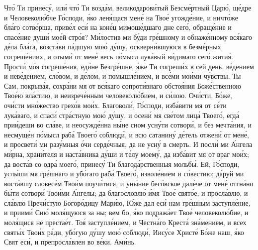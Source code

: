 \begin{mymulticols}
Чт\'{о} Ти принес\'{у}, ил\'{и} чт\'{о} Ти возд\'{а}м, великодаров\'{и}тый Безсм\'{е}ртный Цар\'{ю}, щ\'{е}дре и Человекол\'{ю}бче Г\'{о}споди, \'{я}ко лен\'{я}щася мен\'{е} на Тво\'{е} угожд\'{е}ние, и ничт\'{о}же бл\'{а}го сотв\'{о}рша, прив\'{е}л ес\'{и} на кон\'{е}ц мимош\'{е}дшаго дне сег\'{о}, обращ\'{е}ние и спас\'{е}ние душ\'{и} мо\'{е}й стр\'{о}я? М\'{и}лостив ми б\'{у}ди гр\'{е}шному и обнаж\'{е}нному вс\'{я}каго д\'{е}ла бл\'{а}га, возст\'{а}ви п\'{а}дшую мо\'{ю} д\'{у}шу, оскверн\'{и}вшуюся в безм\'{е}рных согреш\'{е}ниих, и отым\'{и} от мен\'{е} весь п\'{о}мысл лук\'{а}вый в\'{и}димаго сег\'{о} жити\'{я}. Прост\'{и} м\'{о}я согреш\'{е}ния, ед\'{и}не Безгр\'{е}шне, \'{я}же Ти согреш\'{и}х в сей день, в\'{е}дением и нев\'{е}дением, сл\'{о}вом, и д\'{е}лом, и помышл\'{е}нием, и вс\'{е}ми мо\'{и}ми ч\'{у}вствы. Ты Сам, покрыв\'{а}я, сохр\'{а}ни мя от вс\'{я}каго сопрот\'{и}внаго обсто\'{я}ния Бож\'{е}ственною Тво\'{е}ю вл\'{а}стию, и неизреч\'{е}нным человекол\'{ю}бием, и с\'{и}лою. Оч\'{и}сти, Б\'{о}же, оч\'{и}сти мн\'{о}жество грех\'{о}в мо\'{и}х. Благовол\'{и}, Г\'{о}споди, изб\'{а}вити мя от с\'{е}ти лук\'{а}ваго, и спас\'{и} стр\'{а}стную мо\'{ю} д\'{у}шу, и осен\'{и} мя св\'{е}том лиц\'{а} Твоег\'{о}, егд\'{а} при\'{и}деши во сл\'{а}ве, и неосужд\'{е}нна н\'{ы}не сном усн\'{у}ти сотвор\'{и}, и без мечт\'{а}ния, и несмущ\'{е}н п\'{о}мысл раб\'{а} Твоег\'{о} соблюд\'{и}, и всю сатанин\'{у} д\'{е}тель отжен\'{и} от мен\'{е}, и просвет\'{и} ми раз\'{у}мныя \'{о}чи серд\'{е}чныя, да не усн\'{у} в смерть. И посл\'{и} ми \'{А}нгела м\'{и}рна, хран\'{и}теля и наст\'{а}вника д\'{у}ши и т\'{е}лу моем\'{у}, да изб\'{а}вит мя от враг мо\'{и}х; да вост\'{а}в со одр\'{а} моег\'{о}, принес\'{у} Ти благод\'{а}рственныя мольб\'{ы}. Ей, Г\'{о}споди, усл\'{ы}ши мя гр\'{е}шнаго и уб\'{о}гаго раб\'{а} Твоег\'{о}, извол\'{е}нием и с\'{о}вестию; д\'{а}руй ми вост\'{а}вшу словес\'{е}м Тво\'{и}м поуч\'{и}тися, и ун\'{ы}ние бес\'{о}вское дал\'{е}че от мен\'{е} отгн\'{а}но б\'{ы}ти сотвор\'{и} Тво\'{и}ми \'{А}нгелы; да благословл\'{ю} \'{и}мя Тво\'{е} свят\'{о}е, и просл\'{а}влю, и сл\'{а}влю Преч\'{и}стую Богор\'{о}дицу Мар\'{и}ю, \'{Ю}же дал ес\'{и} нам гр\'{е}шным заступл\'{е}ние, и приим\'{и} Си\'{ю} мол\'{я}щуюся за ны; вем бо, \'{я}ко подраж\'{а}ет Тво\'{е} человекол\'{ю}бие, и мол\'{я}щися не преста\'{е}т. То\'{я} заступл\'{е}нием, и Честн\'{а}го Крест\'{а} зн\'{а}мением, и всех свят\'{ы}х Тво\'{и}х р\'{а}ди, уб\'{о}гую д\'{у}шу мо\'{ю} соблюд\'{и}, Иис\'{у}се Христ\'{е} Б\'{о}же наш, \'{я}ко Свят ес\'{и}, и препросл\'{а}влен во в\'{е}ки. Ам\'{и}нь.


\end{mymulticols}
